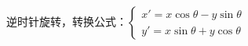 逆时针旋转，转换公式：$\left\{\begin{matrix}
x'=x\cos \theta-y\sin \theta \\ 
y'=x\sin \theta+y\cos \theta
\end{matrix}\right.$